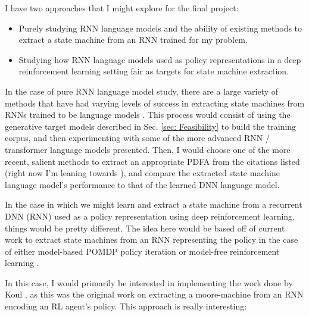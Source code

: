 I have two approaches that I might explore for the final project:

\begin{itemize}
    \item Purely studying RNN language models and the ability of existing methods to extract a state machine from an RNN trained for my problem.
    
    \item Studying how RNN language models used as policy representations in a deep reinforcement learning setting fair as targets for state machine extraction.
\end{itemize}

In the case of pure RNN language model study, there are a large variety of methods that have had varying levels of success in extracting state machines from RNNs trained to be language models \cite{pmlr-v80-weiss18a} \cite{Giles2001} \cite{Weiss2018} \cite{Michalenko2019RepresentingFL} \cite{Le2018DeepSM} \cite{Dong2016} \cite{Ayache2018}. This process would consist of using the generative target models described in Sec. \ref{sec: Feasibility} to build the training corpus, and then experimenting with some of the more advanced RNN / transformer language models presented. Then, I would choose one of the more recent, salient methods to extract an appropriate PDFA from the citations listed (right now I'm leaning towards \cite{Le2018DeepSM}), and compare the extracted state machine language model's performance to that of the learned DNN language model.


In the case in which we might learn and extract a state machine from a recurrent DNN (RNN) used as a policy representation using deep reinforcement learning, things would be pretty different. The idea here would be based off of current work to extract state machines from an RNN representing the policy in the case of either model-based POMDP policy iteration \cite{Carr2019} or model-free reinforcement learning \cite{Koul2019}.

In this case, I would primarily be interested in implementing the work done by Koul \cite{Koul2019}, as this was the original work on extracting a moore-machine from an RNN encoding an RL agent's policy. This approach is really interesting:

